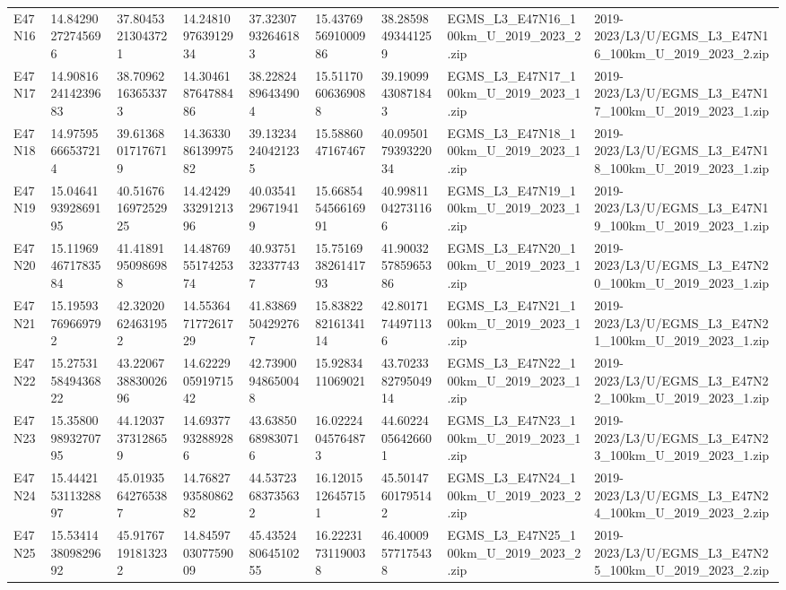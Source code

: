 \begin{landscape}
\begin{longtable}{lllllllll}
E47N16 & 14.84290272745696 & 37.80453213043721 & 14.248109763912934 & 37.32307932646183 & 15.437695691000986 & 38.28598493441259 & EGMS\_L3\_E47N16\_100km\_U\_2019\_2023\_2.zip & 2019-2023/L3/U/EGMS\_L3\_E47N16\_100km\_U\_2019\_2023\_2.zip \\
E47N17 & 14.908162414239683 & 38.70962163653373 & 14.304618764788486 & 38.22824896434904 & 15.51170606369088 & 39.19099430871843 & EGMS\_L3\_E47N17\_100km\_U\_2019\_2023\_1.zip & 2019-2023/L3/U/EGMS\_L3\_E47N17\_100km\_U\_2019\_2023\_1.zip \\
E47N18 & 14.97595666537214 & 39.61368017176719 & 14.363308613997582 & 39.13234240421235 & 15.5886047167467 & 40.095017939322034 & EGMS\_L3\_E47N18\_100km\_U\_2019\_2023\_1.zip & 2019-2023/L3/U/EGMS\_L3\_E47N18\_100km\_U\_2019\_2023\_1.zip \\
E47N19 & 15.046419392869195 & 40.516761697252925 & 14.424293329121396 & 40.03541296719419 & 15.668545456616991 & 40.99811042731166 & EGMS\_L3\_E47N19\_100km\_U\_2019\_2023\_1.zip & 2019-2023/L3/U/EGMS\_L3\_E47N19\_100km\_U\_2019\_2023\_1.zip \\
E47N20 & 15.119694671783584 & 41.41891950986988 & 14.487695517425374 & 40.93751323377437 & 15.751693826141793 & 41.900325785965386 & EGMS\_L3\_E47N20\_100km\_U\_2019\_2023\_1.zip & 2019-2023/L3/U/EGMS\_L3\_E47N20\_100km\_U\_2019\_2023\_1.zip \\
E47N21 & 15.19593769669792 & 42.32020624631952 & 14.553647177261729 & 41.83869504292767 & 15.838228216134114 & 42.80171744971136 & EGMS\_L3\_E47N21\_100km\_U\_2019\_2023\_1.zip & 2019-2023/L3/U/EGMS\_L3\_E47N21\_100km\_U\_2019\_2023\_1.zip \\
E47N22 & 15.275315849436822 & 43.220673883002696 & 14.622290591971542 & 42.73900948650048 & 15.9283411069021 & 43.702338279504914 & EGMS\_L3\_E47N22\_100km\_U\_2019\_2023\_1.zip & 2019-2023/L3/U/EGMS\_L3\_E47N22\_100km\_U\_2019\_2023\_1.zip \\
E47N23 & 15.358009893270795 & 44.12037373128659 & 14.69377932889286 & 43.63850689830716 & 16.02224045764873 & 44.60224056426601 & EGMS\_L3\_E47N23\_100km\_U\_2019\_2023\_1.zip & 2019-2023/L3/U/EGMS\_L3\_E47N23\_100km\_U\_2019\_2023\_1.zip \\
E47N24 & 15.444215311328897 & 45.01935642765387 & 14.768279358086282 & 44.53723683735632 & 16.12015126457151 & 45.50147601795142 & EGMS\_L3\_E47N24\_100km\_U\_2019\_2023\_2.zip & 2019-2023/L3/U/EGMS\_L3\_E47N24\_100km\_U\_2019\_2023\_2.zip \\
E47N25 & 15.534143809829692 & 45.91767191813232 & 14.845970307759009 & 45.435248064510255 & 16.22231731190038 & 46.40009577175438 & EGMS\_L3\_E47N25\_100km\_U\_2019\_2023\_2.zip & 2019-2023/L3/U/EGMS\_L3\_E47N25\_100km\_U\_2019\_2023\_2.zip \\

\end{longtable}
\end{landscape}
